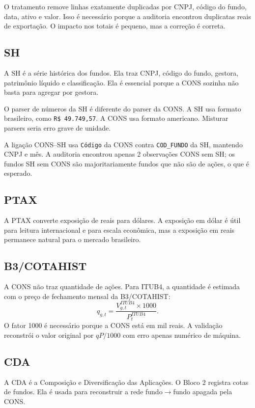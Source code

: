 \documentclass[11pt,a4paper]{article}
\begin{document}
O tratamento remove linhas exatamente duplicadas por CNPJ, código do fundo, data, ativo e valor. Isso é
necessário porque a auditoria encontrou duplicatas reais de exportação. O impacto nos totais é pequeno, mas
a correção é correta.

\subsection{SH}

A SH é a série histórica dos fundos. Ela traz CNPJ, código do fundo, gestora, patrimônio líquido e
classificação. Ela é essencial porque a CONS sozinha não basta para agregar por gestora.

O parser de números da SH é diferente do parser da CONS. A SH usa formato brasileiro, como
\texttt{R\$ 49.749,57}. A CONS usa formato americano. Misturar parsers seria erro grave de unidade.

A ligação CONS--SH usa \texttt{Código} da CONS contra \texttt{COD\_FUNDO} da SH, mantendo CNPJ e mês. A
auditoria encontrou apenas 2 observações CONS sem SH; os fundos SH sem CONS são majoritariamente fundos que
não são de ações, o que é esperado.

\subsection{PTAX}

A PTAX converte exposição de reais para dólares. A exposição em dólar é útil para leitura internacional e
para escala econômica, mas a exposição em reais permanece natural para o mercado brasileiro.

\subsection{B3/COTAHIST}

A CONS não traz quantidade de ações. Para ITUB4, a quantidade é estimada com o preço de fechamento mensal da
B3/COTAHIST:
\[
q_{g,t}=\frac{V_{g,t}^{ITUB4}\times 1000}{P_t^{ITUB4}}.
\]
O fator 1000 é necessário porque a CONS está em mil reais. A validação reconstrói o valor original por
$qP/1000$ com erro apenas numérico de máquina.

\subsection{CDA}

A CDA é a Composição e Diversificação das Aplicações. O Bloco 2 registra cotas de fundos. Ela é usada para
reconstruir a rede fundo$\to$fundo apagada pela CONS.
\end{document}
